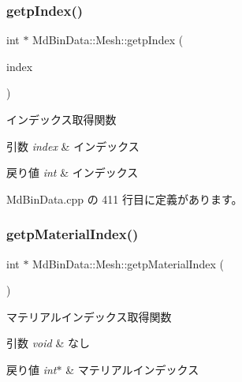 \subsubsection{\texorpdfstring{getp\+Index()}{getpIndex()}}
{\footnotesize\ttfamily int $\ast$ Md\+Bin\+Data\+::\+Mesh\+::getp\+Index (\begin{DoxyParamCaption}\item[{int}]{index }\end{DoxyParamCaption})}



インデックス取得関数 


\begin{DoxyParams}{引数}
{\em index} & インデックス \\
\hline
\end{DoxyParams}

\begin{DoxyRetVals}{戻り値}
{\em int} & インデックス \\
\hline
\end{DoxyRetVals}


 Md\+Bin\+Data.\+cpp の 411 行目に定義があります。

\mbox{\label{class_md_bin_data_1_1_mesh_ab0f1219a5fa3871c03777fa7bb1221c1}} 
\subsubsection{\texorpdfstring{getp\+Material\+Index()}{getpMaterialIndex()}}
{\footnotesize\ttfamily int $\ast$ Md\+Bin\+Data\+::\+Mesh\+::getp\+Material\+Index (\begin{DoxyParamCaption}{ }\end{DoxyParamCaption})}



マテリアルインデックス取得関数 


\begin{DoxyParams}{引数}
{\em void} & なし \\
\hline
\end{DoxyParams}

\begin{DoxyRetVals}{戻り値}
{\em int$\ast$} & マテリアルインデックス \\
\hline
\end{DoxyRetVals}


